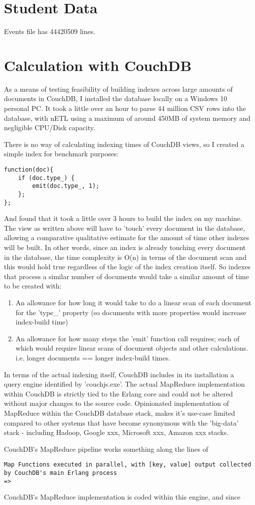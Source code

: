 \section{Student Data}
Events file has 44420509 lines.

\section{Calculation with CouchDB}
As a means of testing feasibility of building indexes across large amounts of documents in CouchDB, I installed the database locally on a Windows 10 personal PC. It took a little over an hour to parse 44 million CSV rows into the database, with nETL using a maximum of around 450MB of system memory and negligible CPU/Disk capacity.

There is no way of calculating indexing times of CouchDB views, so I created a simple index for benchmark purposes:

\begin{verbatim}
function(doc){
    if (doc.type_) {
        emit(doc.type_, 1);
    };
};
\end{verbatim}

And found that it took a little over 3 hours to build the index on my machine. The view as written above will have to 'touch' every document in the database, allowing a comparative qualitative estimate for the amount of time other indexes will be built. In other words, since an index is already touching every document in the database, the time complexity is O(n) in terms of the document scan and this would hold true regardless of the logic of the index creation itself. So indexes that process a similar number of documents would take a similar amount of time to be created with:

\begin{enumerate}
    \item An allowance for how long it would take to do a linear scan of each document for the 'type\_' property (so documents with more properties would increase index-build time)
    \item An allowance for how many steps the 'emit' function call requires; each of which would require linear scans of document objects and other calculations. i.e. longer documents == longer index-build times.
\end{enumerate}

In terms of the actual indexing itself, CouchDB includes in its installation a query engine identified by 'couchjs.exe'. The actual MapReduce implementation within CouchDB is strictly tied to the Erlang core and could not be altered without major changes to the source code. Opinionated implementation of MapReduce within the CouchDB database stack, makes it's use-case limited compared to other systems that have become synonymous with the 'big-data' stack - including Hadoop, Google xxx, Microsoft xxx, Amazon xxx stacks.

CouchDB's MapReduce pipeline works something along the lines of

\begin{verbatim}
Map Functions executed in parallel, with [key, value] output collected by CouchDB's main Erlang process
=> 
\end{verbatim}

CouchDB's MapReduce implementation is coded within this engine, and since